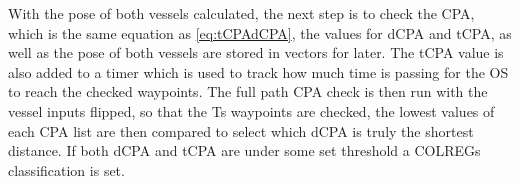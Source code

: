 
With the pose of both vessels calculated, the next step is to check the CPA, which is the same equation as \eqref{eq:tCPAdCPA}, the values for
\gls{dCPA} and \gls{tCPA}, as well as the pose of both vessels are stored in vectors for later. The \gls{tCPA} value is also added to a timer which is
used to track how much time is passing for the \gls{OS} to reach the checked waypoints.
The full path CPA check is then run with the vessel inputs flipped, so that the \gls{Ts} waypoints are checked, the lowest values of each CPA list
are then compared to select which \gls{dCPA} is truly the shortest distance. If both dCPA and tCPA are under some set threshold a COLREGs classification is set.

